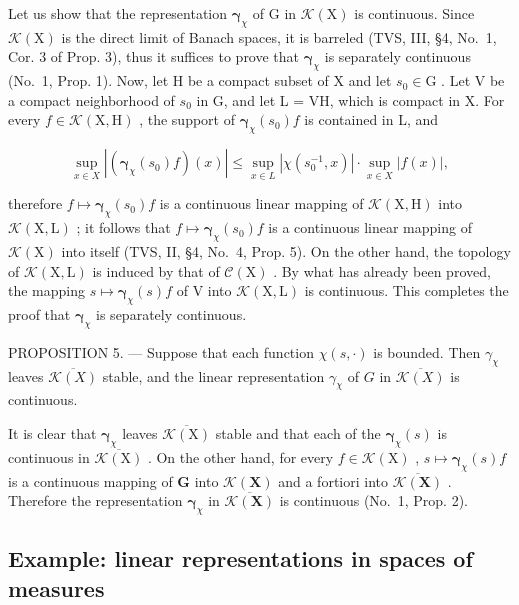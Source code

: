 Let us show that the representation \(\pmb{\gamma}_{\chi}\) of G in \(\mathcal{K}(\mathrm{X})\) is continuous. Since \(\mathcal{K}(\mathrm{X})\) is the direct limit of Banach spaces, it is barreled (TVS, III, §4, No.~1, Cor. 3 of Prop. 3), thus it suffices to prove that \(\pmb{\gamma}_{\chi}\) is separately continuous (No.~1, Prop. 1). Now, let H be a compact subset of X and let \(s_0 \in \mathrm{G}\) . Let V be a compact neighborhood of \(s_0\) in G, and let L = VH, which is compact in X. For every \(f \in \mathcal{K}(\mathrm{X}, \mathrm{H})\) , the support of \(\pmb{\gamma}_{\chi}(s_0)f\) is contained in L, and

\[
\sup _ {x \in X} | (\boldsymbol {\gamma} _ {\chi} (s _ {0}) f) (x) | \leqslant \sup _ {x \in L} | \chi (s _ {0} ^ {- 1}, x) | \cdot \sup _ {x \in X} | f (x) |,
\]

therefore \(f \mapsto \boldsymbol{\gamma}_{\chi}(s_0)f\) is a continuous linear mapping of \(\mathcal{K}(\mathrm{X},\mathrm{H})\) into \(\mathcal{K}(\mathrm{X},\mathrm{L})\) ; it follows that \(f \mapsto \boldsymbol{\gamma}_{\chi}(s_0)f\) is a continuous linear mapping of \(\mathcal{K}(\mathrm{X})\) into itself (TVS, II, §4, No.~4, Prop. 5). On the other hand, the topology of \(\mathcal{K}(\mathrm{X},\mathrm{L})\) is induced by that of \(\mathcal{C}(\mathrm{X})\) . By what has already been proved, the mapping \(s \mapsto \boldsymbol{\gamma}_{\chi}(s)f\) of \(\mathrm{V}\) into \(\mathcal{K}(\mathrm{X},\mathrm{L})\) is continuous. This completes the proof that \(\boldsymbol{\gamma}_{\chi}\) is separately continuous.

PROPOSITION 5. --- Suppose that each function \(\chi(s,\cdot)\) is bounded. Then \(\gamma_{\chi}\) leaves \(\overline{\mathcal{K}(X)}\) stable, and the linear representation \(\gamma_{\chi}\) of \(G\) in \(\overline{\mathcal{K}(X)}\) is continuous.

It is clear that \(\pmb{\gamma}_{\chi}\) leaves \(\overline{\mathcal{K}(\mathrm{X})}\) stable and that each of the \(\pmb{\gamma}_{\chi}(s)\) is continuous in \(\overline{\mathcal{K}(\mathrm{X})}\) . On the other hand, for every \(f \in \mathcal{K}(\mathrm{X})\) , \(s \mapsto \pmb{\gamma}_{\chi}(s)f\) is a continuous mapping of \(\mathbf{G}\) into \(\mathcal{K}(\mathbf{X})\) and a fortiori into \(\overline{\mathcal{K}(\mathbf{X})}\) . Therefore the representation \(\pmb{\gamma}_{\chi}\) in \(\overline{\mathcal{K}(\mathbf{X})}\) is continuous (No.~1, Prop. 2).

\subsection{Example: linear representations in spaces of measures}

